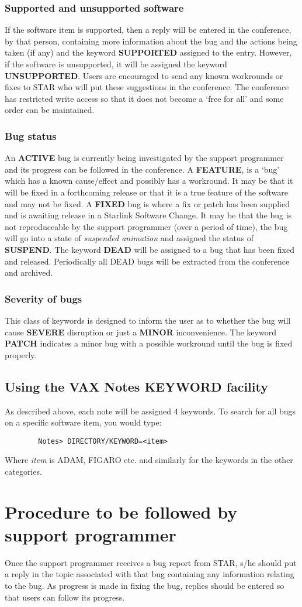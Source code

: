 \subsubsection{Supported and unsupported software}
If the software item is supported, then a reply will be entered in the
conference, by that person, containing more information about the bug and the
actions being taken (if any) and the keyword {\bf SUPPORTED} assigned to the
entry. However, if the software is unsupported, it will
be assigned the keyword {\bf UNSUPPORTED}. Users are encouraged to send any
known workrounds or fixes to STAR who will put these suggestions in the
conference. The conference has restricted write access so that it does not
become a `free for all' and some order can be maintained.
\subsubsection{Bug status}
An {\bf ACTIVE} bug is currently being investigated by the support programmer
and its progress can be followed in the conference. A {\bf FEATURE}, is a `bug'
which has a known cause/effect and possibly has a workround. 
It may be that it will be
fixed in a forthcoming release or that it is a true feature of the software and
may not be fixed. A {\bf FIXED} bug is where a fix or patch has been supplied 
and is awaiting release in a Starlink Software Change. It may be that the bug 
is not reproduceable by the support programmer (over a period of time), the 
bug will go into a state of {\em suspended animation} and assigned the status 
of {\bf SUSPEND}. The keyword {\bf DEAD} will be assigned to a bug that has
been fixed and released. Periodically all DEAD bugs will be extracted from the
conference and archived.
\subsubsection{Severity of bugs}
This class of keywords is designed to inform the user as to whether the bug
will cause {\bf SEVERE} disruption or just a {\bf MINOR} inconvenience. The
keyword {\bf PATCH} indicates a minor bug with a possible workround 
until the bug is fixed properly.
\subsection{Using the VAX Notes KEYWORD facility}
As described above, each note will be assigned 4 keywords. To search for all
bugs on a specific software item, you would type:
\begin{verbatim}
        Notes> DIRECTORY/KEYWORD=<item>  
\end{verbatim}
Where {\em item} is ADAM, FIGARO  etc.
and similarly for the keywords in the other categories.
\newpage
\section{Procedure to be followed by support programmer}
Once the support programmer receives a bug report from STAR, s/he should put a
reply in the topic associated with that bug containing any information relating
to the bug. As progress is made in fixing the bug, replies should be entered
so that users can follow its progress. 

